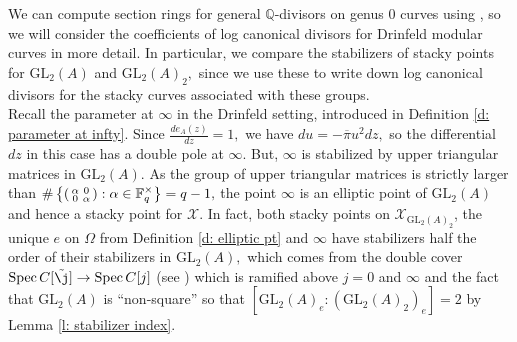 \documentclass[11pt]{amsart}
\theoremstyle{definition}
\newenvironment{psmallmatrix}
{\left(\begin{smallmatrix}}
	{\end{smallmatrix}\right)}
\numberwithin{equation}{section}
\newcommand{\GL}{\mathrm{GL}} 	%
\newcommand{\Spec}{\operatorname{Spec}} 	%
\newcommand{\sX}{\mathscr{X}}		%
\newcommand{\bbF}{\mathbb{F}}		%
\newcommand{\bbQ}{\mathbb{Q}}		%
\begin{document}
We can compute section rings for general $\bbQ$-divisors on genus $0$ curves using \cite{ODorney-canonical-rings-Q-divisors-on-P1}, so 
we will consider the coefficients of log canonical divisors for Drinfeld modular curves in more detail. In particular, we compare the stabilizers of stacky points for $\GL_2(A)$ and $\GL_2(A)_2,$ since we use these to write down log canonical divisors for the stacky curves associated with these groups.\\ 

Recall the parameter at $\infty$ in the Drinfeld setting, introduced in Definition \ref{d: parameter at infty}. Since $\displaystyle{\frac{de_A(z)}{dz}=1},$ we have 
$du = -\overline{\pi}u^2 dz,$ so the differential $dz$ in this case has a double pole at $\infty.$ But, $\infty$ is stabilized by upper triangular matrices in $\GL_2(A).$ As the group of upper triangular matrices is strictly larger than $\displaystyle{\#\left\{\begin{psmallmatrix}\alpha&0\\0&\alpha\end{psmallmatrix}:\alpha\in \bbF_q^{\times} \right\}}=q-1,$ the point $\infty$ is an elliptic point of $\GL_2(A)$ and hence a stacky point for $\sX.$ In fact, both stacky points on $\sX_{\GL_2(A)_2}$, the unique $e$ on $\Omega$ from Definition \ref{d: elliptic pt} and $\infty$ have stabilizers half the order of their stabilizers in $\GL_2(A),$ which comes from the double cover $\Spec C[\tilde{\j}]\to \Spec C[j]$ (see \cite[Page $312$]{Breuer-Gekeler-h-function}) which is ramified above $j=0$ and $\infty$ and the fact that $\GL_2(A)$ is ``non-square'' so that $[\GL_2(A)_e:(\GL_2(A)_2)_e]=2$ by Lemma \ref{l: stabilizer index}.\\

\end{document}
